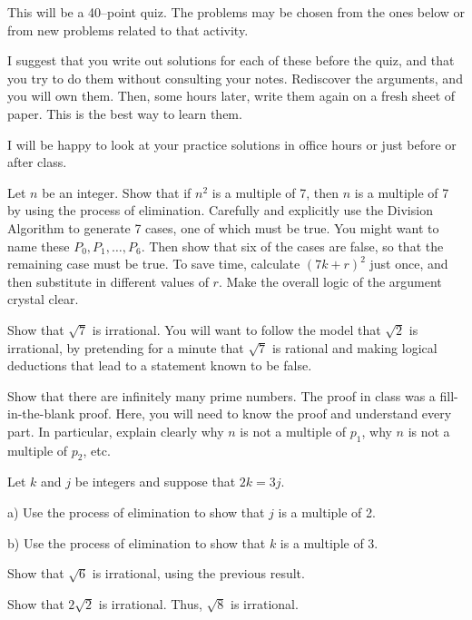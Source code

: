 
This will be a 40--point quiz.
The problems may be chosen from the ones below or from new problems related to that activity.

I suggest that you write out solutions for each of these before the quiz, and that you try to do them without consulting your notes.
Rediscover the arguments, and you will own them.
Then, some hours later, write them again on a fresh sheet of paper.
This is the best way to learn them.

I will be happy to look at your practice solutions in office hours or just before or after class.

\blist{0.5in}
\item Let $n$ be an integer.  Show that if $n^2$ is a multiple of 7, then $n$ is a multiple of 7 by using the process of elimination.
Carefully and explicitly use the Division Algorithm to generate 7 cases, one of which must be true.
You might want to name these $P_0, P_1, \ldots, P_6$.
Then show that six of the cases are false, so that the remaining case must be true.
To save time, calculate $(7k+r)^2$ just once, and then substitute in different values of $r$.
Make the overall logic of the argument crystal clear.

\item Show that $\sqrt{7}$ is irrational.
You will want to follow the model that $\sqrt{2}$ is irrational, by pretending for a minute that $\sqrt{7}$ is rational and making logical deductions that lead to a statement known to be false.

\item Show that there are infinitely many prime numbers.
The proof in class was a fill-in-the-blank proof.  Here, you will need to know the proof and understand every part.
In particular, explain clearly why $n$ is not a multiple of $p_1$, why $n$ is not a multiple of $p_2$, etc.

\item Let $k$ and $j$ be integers and suppose that $2k = 3j$.

a) Use the process of elimination to show that $j$ is a multiple of 2.

b) Use the process of elimination to show that $k$ is a multiple of 3.

\item Show that $\sqrt{6}$ is irrational, using the previous result.

\item Show that $2\sqrt{2}$ is irrational.  Thus, $\sqrt{8}$ is irrational.

\elist
\vfill          %
